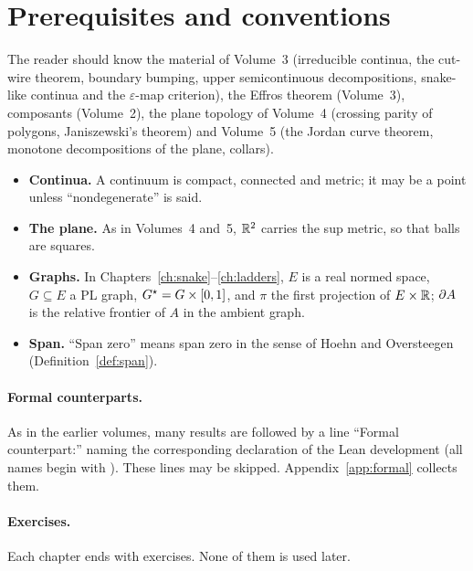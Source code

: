 \section{Prerequisites and conventions}\label{sec:intro-conv}

The reader should know the material of Volume~3 (irreducible continua, the cut-wire theorem, boundary bumping, upper semicontinuous decompositions,
snake-like continua and the $\varepsilon$-map criterion), the Effros theorem (Volume~3), composants (Volume~2), the plane topology of Volume~4 (crossing parity of polygons, Janiszewski's
theorem) and Volume~5 (the Jordan curve theorem, monotone decompositions of the plane, collars).

\begin{itemize}
\item \textbf{Continua.} A continuum is compact, connected and metric; it may be a point unless ``nondegenerate'' is said.
\item \textbf{The plane.} As in Volumes~4 and~5, $\mathbb{R}^2$ carries the sup metric, so that balls are squares.
\item \textbf{Graphs.} In Chapters~\ref{ch:snake}--\ref{ch:ladders}, $E$ is a real normed space, $G\subseteq E$ a PL graph, $G^\star=G\times[0,1]$, and $\pi$ the first projection of $E\times\mathbb{R}$; $\partial A$ is
the relative frontier of $A$ in the ambient graph.
\item \textbf{Span.} ``Span zero'' means span zero in the sense of Hoehn and Oversteegen (Definition~\ref{def:span}).
\end{itemize}

\paragraph{Formal counterparts.} As in the earlier volumes, many results are followed by a line ``Formal counterpart:'' naming the corresponding declaration of the
Lean development (all names begin with ). These lines may be skipped. Appendix~\ref{app:formal} collects them.

\paragraph{Exercises.} Each chapter ends with exercises. None of them is used later.
